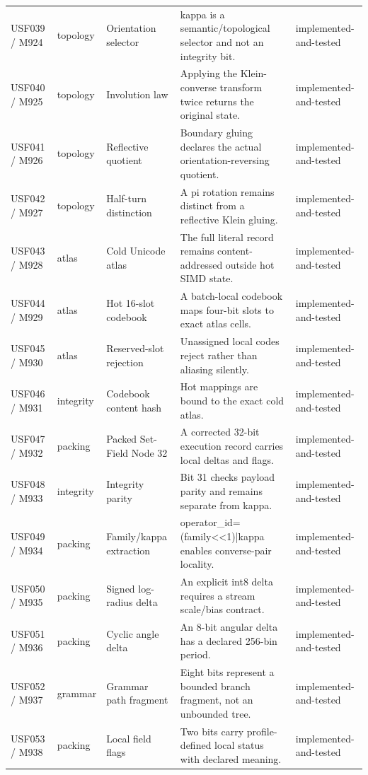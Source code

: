 \documentclass[11pt,a4paper]{article}
\begin{document}
\begin{longtable}{P{20mm}P{15mm}P{28mm}P{70mm}P{20mm}}
USF039 / M924 & topology & Orientation selector & kappa is a semantic/topological selector and not an integrity bit. & implemented-and-tested \\
USF040 / M925 & topology & Involution law & Applying the Klein-converse transform twice returns the original state. & implemented-and-tested \\
USF041 / M926 & topology & Reflective quotient & Boundary gluing declares the actual orientation-reversing quotient. & implemented-and-tested \\
USF042 / M927 & topology & Half-turn distinction & A pi rotation remains distinct from a reflective Klein gluing. & implemented-and-tested \\
USF043 / M928 & atlas & Cold Unicode atlas & The full literal record remains content-addressed outside hot SIMD state. & implemented-and-tested \\
USF044 / M929 & atlas & Hot 16-slot codebook & A batch-local codebook maps four-bit slots to exact atlas cells. & implemented-and-tested \\
USF045 / M930 & atlas & Reserved-slot rejection & Unassigned local codes reject rather than aliasing silently. & implemented-and-tested \\
USF046 / M931 & integrity & Codebook content hash & Hot mappings are bound to the exact cold atlas. & implemented-and-tested \\
USF047 / M932 & packing & Packed Set-Field Node 32 & A corrected 32-bit execution record carries local deltas and flags. & implemented-and-tested \\
USF048 / M933 & integrity & Integrity parity & Bit 31 checks payload parity and remains separate from kappa. & implemented-and-tested \\
USF049 / M934 & packing & Family/kappa extraction & operator\_id=(family\textless{}\textless{}1)|kappa enables converse-pair locality. & implemented-and-tested \\
USF050 / M935 & packing & Signed log-radius delta & An explicit int8 delta requires a stream scale/bias contract. & implemented-and-tested \\
USF051 / M936 & packing & Cyclic angle delta & An 8-bit angular delta has a declared 256-bin period. & implemented-and-tested \\
USF052 / M937 & grammar & Grammar path fragment & Eight bits represent a bounded branch fragment, not an unbounded tree. & implemented-and-tested \\
USF053 / M938 & packing & Local field flags & Two bits carry profile-defined local status with declared meaning. & implemented-and-tested \\

\end{longtable}
\end{document}
